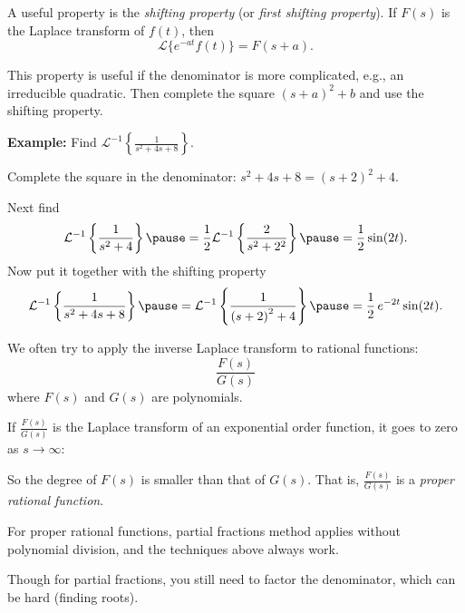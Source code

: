 \documentclass[10pt,aspectratio=169]{beamer}
\begin{document}
\begin{frame}

A useful property is the 
\emph{shifting property} (or \emph{first shifting property}).
If $F(s)$ is the Laplace transform of $f(t)$, then
\begin{equation*}
\mathcal{L} \bigl\{ e^{-at} f(t) \bigr\} = F(s+a) .
\end{equation*}

\pause
This property is useful if the denominator is more complicated, e.g.,
an irreducible quadratic.  Then complete the square
 ${(s+a)}^2+b$
and use
the shifting property.

\medskip
\pause

\textbf{Example:}
Find
$\displaystyle {\mathcal{L}}^{-1} \left\{ \frac{1}{s^2+4s+8} \right\}$.

\medskip
\pause

Complete the square in the denominator:
$s^2+4s+8 = {(s+2)}^2+4$.

\medskip
\pause

Next find
\begin{equation*}
{\mathcal{L}}^{-1} \left\{ \frac{1}{s^2+4} \right\}
\pause
=
\frac{1}{2}
{\mathcal{L}}^{-1} \left\{ \frac{2}{s^2+2^2} \right\}
\pause
=
\frac{1}{2} \sin (2t) .
\end{equation*}
\pause
Now put it together with the shifting property
\begin{equation*}
{\mathcal{L}}^{-1} \left\{ \frac{1}{s^2+4s+8} \right\}
\pause
= 
{\mathcal{L}}^{-1} \left\{ \frac{1}{{(s+2)}^2+4} \right\}
\pause
=
\frac{1}{2}\,e^{-2t} \sin (2t) .
\end{equation*}
\end{frame}

\begin{frame}
We often try to 
apply the inverse Laplace transform to
rational functions:
\begin{equation*}
\frac{F(s)}{G(s)}
\end{equation*}
where $F(s)$ and $G(s)$ are polynomials.

\medskip
\pause

If $\frac{F(s)}{G(s)}$ is the Laplace transform of an exponential order function,
it goes to zero as $s \to \infty$:

\pause
So the degree of $F(s)$
is smaller than that of $G(s)$.
That is,
$\frac{F(s)}{G(s)}$ is a \emph{proper rational function}.

\medskip
\pause

For proper rational functions, partial fractions method applies without
polynomial division, and the techniques above always work.

\medskip
\pause

Though for partial fractions, you still need to factor the denominator,
which can be hard (finding roots).

\end{frame}
\end{document}
